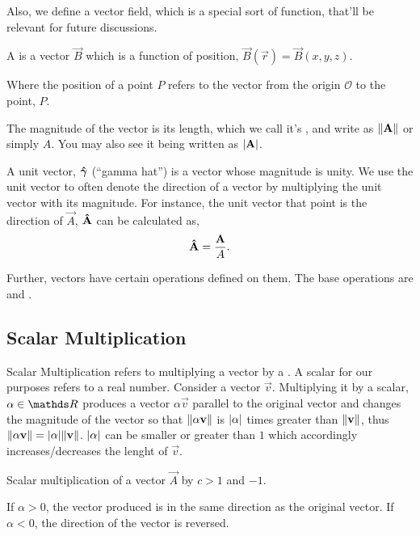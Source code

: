 Also, we define a vector field, which is a special sort of function, that'll be relevant 
for future discussions.

\begin{definition}
  A  is a vector \(\vec{B}\) which is a function of position, \(\vec{B}(\vec{r}) = \vec{B}(x, y, z)\). 
\end{definition}

Where the position of a point \(P\) refers to the vector from the origin \(\mathcal{O}\) to the point, \(P\).

The magnitude of the vector is its length, which we call it's , and write
as \(\norm{\mathbf{\boldsymbol{A}}}\) or simply \(A\). You may also see it being written as \(\abs{\mathbf{\boldsymbol{A}}}\).

A unit vector, \(\mathbf{\boldsymbol{\hat{\gamma}}}\) (“gamma hat”) is a vector whose magnitude is unity. We use the unit vector to
often denote the direction of a vector by multiplying the unit vector with its magnitude.
For instance, the unit vector that point is the direction of \(\vec{A}\), \(\mathbf{\boldsymbol{\hat{A}}}\) can be calculated as,
\[
\mathbf{\boldsymbol{\hat{A}}} = \frac{\mathbf{\boldsymbol{A}}}{A}.
\]

Further, vectors have certain operations defined on them. The base operations
are  and .

\subsection{Scalar Multiplication}  

Scalar Multiplication refers to multiplying a vector by a . A scalar
for our purposes refers to a real number. Consider a vector \(\vec{v}\).
Multiplying it by a scalar, \(\alpha \in \RR\) produces a vector 
\(\alpha\vec{v}\) parallel to the original vector and changes the magnitude of the vector so that
\(\norm{\alpha\mathbf{\boldsymbol{v}}}\) is \(\abs{\alpha}\) times greater than \(\norm{\mathbf{\boldsymbol{v}}}\), thus
\(\norm{\alpha \mathbf{\boldsymbol{v}}} = \abs{\alpha}\norm{\mathbf{\boldsymbol{v}}}\). \(\abs{\alpha}\) can 
be smaller or greater than \(1\) which accordingly increases/decreases the 
lenght of \(\vec{v}\).

\begin{marginfigure}
  \centering
  \caption{Scalar multiplication of a vector \(\vec{A}\) by \(c > 1\) and \(-1\).}
\end{marginfigure}

If \(\alpha > 0\), the vector produced is in the same direction as the original vector. If
\(\alpha < 0\), the direction of the vector is reversed. 

